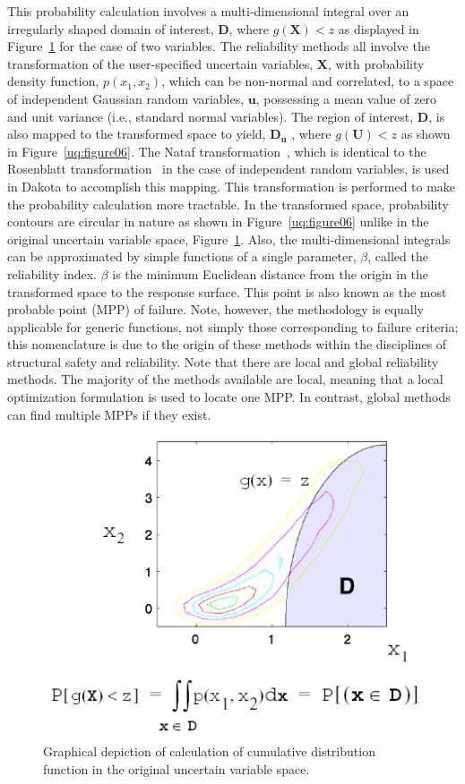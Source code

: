 This probability calculation involves a multi-dimensional integral
over an irregularly shaped domain of interest, $\mathbf{D}$, where
$g(\mathbf{X}) < z$ as displayed in Figure~\ref{uq:figure05} for the
case of two variables. The reliability methods all involve the
transformation of the user-specified uncertain variables,
$\mathbf{X}$, with probability density function, $p(x_1,x_2)$, which
can be non-normal and correlated, to a space of independent Gaussian
random variables, $\mathbf{u}$, possessing a mean value of zero and
unit variance (i.e., standard normal variables). The region of
interest, $\mathbf{D}$, is also mapped to the transformed space to
yield, $\mathbf{D_{u}}$ , where $g(\mathbf{U}) < z$ as shown in
Figure~\ref{uq:figure06}. The Nataf transformation~\cite{Der86},
which is identical to the Rosenblatt transformation~\cite{Ros52} in
the case of independent random variables, is used in Dakota to
accomplish this mapping. This transformation is performed to make the
probability calculation more tractable. In the transformed space,
probability contours are circular in nature as shown in
Figure~\ref{uq:figure06} unlike in the original uncertain variable
space, Figure~\ref{uq:figure05}. Also, the multi-dimensional integrals
can be approximated by simple functions of a single parameter,
$\beta$, called the reliability index. $\beta$ is the minimum
Euclidean distance from the origin in the transformed space to the
response surface. This point is also known as the most probable point
(MPP) of failure. Note, however, the methodology is equally applicable
for generic functions, not simply those corresponding to failure
criteria; this nomenclature is due to the origin of these methods
within the disciplines of structural safety and reliability.
Note that there are local and global reliability methods. The majority 
of the methods available are local, meaning that a local optimization 
formulation is used to locate one MPP. In contrast, global methods
can find multiple MPPs if they exist.
\begin{figure}
  \centering
  \includegraphics[scale=0.75]{images/cdf_orig_graphic}
  \caption{Graphical depiction of calculation of cumulative
    distribution function in the original uncertain variable space.}
  \label{uq:figure05}
\end{figure}

